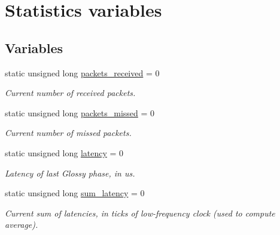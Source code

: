 \hypertarget{group__glossy-test-variables-stats}{
\section{Statistics variables}
\label{group__glossy-test-variables-stats}
}
\subsection*{Variables}
\begin{DoxyCompactItemize}
\item 
\hypertarget{group__glossy-test-variables-stats_ga054c8218353e2ee195a4a8bbea380a95}{
static unsigned long \hyperlink{group__glossy-test-variables-stats_ga054c8218353e2ee195a4a8bbea380a95}{packets\_\-received} = 0}
\label{group__glossy-test-variables-stats_ga054c8218353e2ee195a4a8bbea380a95}

\begin{DoxyCompactList}\small\item\em Current number of received packets. \end{DoxyCompactList}\item 
\hypertarget{group__glossy-test-variables-stats_ga1f7d22828e5e1c2a13c4dcd71a000420}{
static unsigned long \hyperlink{group__glossy-test-variables-stats_ga1f7d22828e5e1c2a13c4dcd71a000420}{packets\_\-missed} = 0}
\label{group__glossy-test-variables-stats_ga1f7d22828e5e1c2a13c4dcd71a000420}

\begin{DoxyCompactList}\small\item\em Current number of missed packets. \end{DoxyCompactList}\item 
\hypertarget{group__glossy-test-variables-stats_gaad9aca10bbb196083acdc1981d5502b5}{
static unsigned long \hyperlink{group__glossy-test-variables-stats_gaad9aca10bbb196083acdc1981d5502b5}{latency} = 0}
\label{group__glossy-test-variables-stats_gaad9aca10bbb196083acdc1981d5502b5}

\begin{DoxyCompactList}\small\item\em Latency of last Glossy phase, in us. \end{DoxyCompactList}\item 
\hypertarget{group__glossy-test-variables-stats_gac156624836ae9355d8f554bf0969254b}{
static unsigned long \hyperlink{group__glossy-test-variables-stats_gac156624836ae9355d8f554bf0969254b}{sum\_\-latency} = 0}
\label{group__glossy-test-variables-stats_gac156624836ae9355d8f554bf0969254b}

\begin{DoxyCompactList}\small\item\em Current sum of latencies, in ticks of low-\/frequency clock (used to compute average). \end{DoxyCompactList}\end{DoxyCompactItemize}
